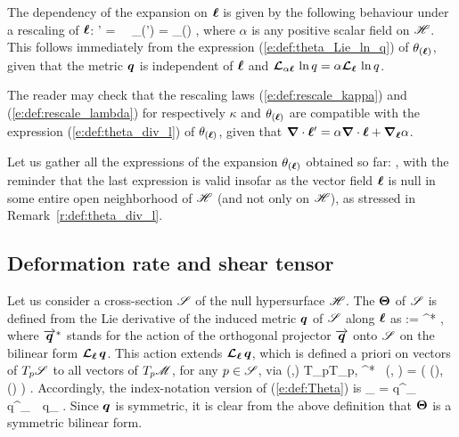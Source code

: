 {The dependency of the expansion on $\bm{\ell}$ is given by the following
behaviour under a rescaling of $\bm{\ell}$:
\be \label{e:def:rescale_lambda}
   \wl' = \alpha \wl \ \Longrightarrow \ \theta_{(\wl')} = \alpha \theta_{(\wl)} ,
\ee
where $\alpha$ is any positive scalar field on $\mathscr{H}$. This follows immediately
from the expression (\ref{e:def:theta_Lie_ln_q}) of $\theta_{(\bm{\ell})}$, given
that the metric $\bm{q}$ is independent of $\bm{\ell}$ and
$\bm{\mathcal{L}}_{\alpha\bm{\ell}}\,\ln q = \alpha \bm{\mathcal{L}}_{\bm{\bm{\ell}}}\,\ln q$.
\begin{remark}
The reader may check that the rescaling laws (\ref{e:def:rescale_kappa})
and (\ref{e:def:rescale_lambda}) for respectively $\kappa$ and $\theta_{(\bm{\ell})}$
are compatible with the expression (\ref{e:def:theta_div_l}) of $\theta_{(\bm{\ell})}$,
given that $\bm{\nabla}\cdot \bm{\ell}' = \alpha\bm{\nabla}\cdot\bm{\ell} + \bm{\nabla}_{\bm{\ell}} \alpha$.
\end{remark}

Let us gather all the expressions of the expansion $\theta_{(\bm{\ell})}$ obtained
so far:
\be \label{e:def:theta_l_all}
     ,
\ee
with the reminder that the last expression is valid insofar as the vector field $\bm{\ell}$ is
null in some entire open neighborhood of $\mathscr{H}$ (and not only on $\mathscr{H}$), as
stressed in Remark~\ref{r:def:theta_div_l}.

\subsection{Deformation rate and shear tensor}

Let us consider a cross-section $\mathscr{S}$ of the null hypersurface $\mathscr{H}$.
The  $\bm{\Theta}$ of $\mathscr{S}$ is defined from the Lie
derivative of the induced metric $\bm{q}$ of $\mathscr{S}$ along $\bm{\ell}$ as
\be \label{e:def:Theta}
    \w{\Theta} :=  ^* \Lie{\el}  ,
\ee
where $\overrightarrow{\bm{q}}^*$ stands for the action of the orthogonal projector $\overrightarrow{\bm{q}}$
onto $\mathscr{S}$ on the bilinear form $\bm{\mathcal{L}}_{\bm{\ell}}\, \bm{q}$.
This action extends $\bm{\mathcal{L}}_{\bm{\ell}}\, \bm{q}$, which is defined a priori on
vectors of $T_p\mathscr{S}$ to all vectors of $T_p\mathscr{M}$, for any $p\in\mathscr{S}$, via
\be
    \forall (,) \in T_p\M \times T_p\M, \quad
         ^* \Lie{\el} \,  (, ) =
         \Lie{\el}  \left( (), () \right) .
\ee
Accordingly, the index-notation version of (\ref{e:def:Theta}) is
\be \label{e:def:Theta_index}
    \Theta_{\alpha\beta} =  q^\mu_{\ \, \alpha} q^\nu_{\ \, \beta}
            \Liec{\el} q_{\mu\nu} .
\ee
Since $\bm{q}$ is symmetric, it is clear from the above definition that
$\bm{\Theta}$ is a symmetric bilinear form.

}
